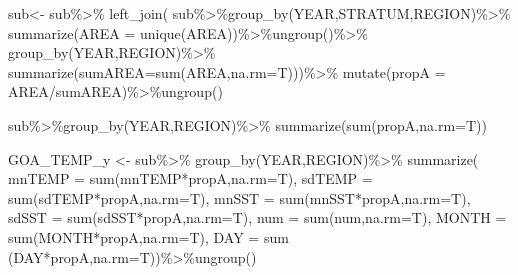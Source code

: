 \documentclass[
]{article}
\newenvironment{Shaded}{\begin{snugshade}}{\end{snugshade}}
\newcommand{\AttributeTok}[1]{\textcolor[rgb]{0.77,0.63,0.00}{#1}}
\newcommand{\FunctionTok}[1]{\textcolor[rgb]{0.00,0.00,0.00}{#1}}
\newcommand{\NormalTok}[1]{#1}
\newcommand{\OtherTok}[1]{\textcolor[rgb]{0.56,0.35,0.01}{#1}}
\newcommand{\SpecialCharTok}[1]{\textcolor[rgb]{0.00,0.00,0.00}{#1}}
\begin{document}
\begin{Shaded}
\begin{Highlighting}[]
\NormalTok{  sub}\OtherTok{\textless{}{-}}\NormalTok{ sub}\SpecialCharTok{\%\textgreater{}\%}
    \FunctionTok{left\_join}\NormalTok{(}
\NormalTok{      sub}\SpecialCharTok{\%\textgreater{}\%}\FunctionTok{group\_by}\NormalTok{(YEAR,STRATUM,REGION)}\SpecialCharTok{\%\textgreater{}\%}
        \FunctionTok{summarize}\NormalTok{(}\AttributeTok{AREA =} \FunctionTok{unique}\NormalTok{(AREA))}\SpecialCharTok{\%\textgreater{}\%}\FunctionTok{ungroup}\NormalTok{()}\SpecialCharTok{\%\textgreater{}\%}
        \FunctionTok{group\_by}\NormalTok{(YEAR,REGION)}\SpecialCharTok{\%\textgreater{}\%}
        \FunctionTok{summarize}\NormalTok{(}\AttributeTok{sumAREA=}\FunctionTok{sum}\NormalTok{(AREA,}\AttributeTok{na.rm=}\NormalTok{T)))}\SpecialCharTok{\%\textgreater{}\%}
    \FunctionTok{mutate}\NormalTok{(}\AttributeTok{propA =}\NormalTok{ AREA}\SpecialCharTok{/}\NormalTok{sumAREA)}\SpecialCharTok{\%\textgreater{}\%}\FunctionTok{ungroup}\NormalTok{()}
    
  
\NormalTok{  sub}\SpecialCharTok{\%\textgreater{}\%}\FunctionTok{group\_by}\NormalTok{(YEAR,REGION)}\SpecialCharTok{\%\textgreater{}\%}
        \FunctionTok{summarize}\NormalTok{(}\FunctionTok{sum}\NormalTok{(propA,}\AttributeTok{na.rm=}\NormalTok{T))}
  
  
\NormalTok{  GOA\_TEMP\_y }\OtherTok{\textless{}{-}}\NormalTok{ sub}\SpecialCharTok{\%\textgreater{}\%}
    \FunctionTok{group\_by}\NormalTok{(YEAR,REGION)}\SpecialCharTok{\%\textgreater{}\%}
    \FunctionTok{summarize}\NormalTok{(}
        \AttributeTok{mnTEMP =} \FunctionTok{sum}\NormalTok{(mnTEMP}\SpecialCharTok{*}\NormalTok{propA,}\AttributeTok{na.rm=}\NormalTok{T),}
        \AttributeTok{sdTEMP =} \FunctionTok{sum}\NormalTok{(sdTEMP}\SpecialCharTok{*}\NormalTok{propA,}\AttributeTok{na.rm=}\NormalTok{T),}
        \AttributeTok{mnSST  =} \FunctionTok{sum}\NormalTok{(mnSST}\SpecialCharTok{*}\NormalTok{propA,}\AttributeTok{na.rm=}\NormalTok{T),}
        \AttributeTok{sdSST  =} \FunctionTok{sum}\NormalTok{(sdSST}\SpecialCharTok{*}\NormalTok{propA,}\AttributeTok{na.rm=}\NormalTok{T),}
        \AttributeTok{num    =} \FunctionTok{sum}\NormalTok{(num,}\AttributeTok{na.rm=}\NormalTok{T),}
        \AttributeTok{MONTH  =} \FunctionTok{sum}\NormalTok{(MONTH}\SpecialCharTok{*}\NormalTok{propA,}\AttributeTok{na.rm=}\NormalTok{T),}
        \AttributeTok{DAY    =} \FunctionTok{sum}\NormalTok{ (DAY}\SpecialCharTok{*}\NormalTok{propA,}\AttributeTok{na.rm=}\NormalTok{T))}\SpecialCharTok{\%\textgreater{}\%}\FunctionTok{ungroup}\NormalTok{()}
  

\end{Highlighting}
\end{Shaded}
\end{document}
